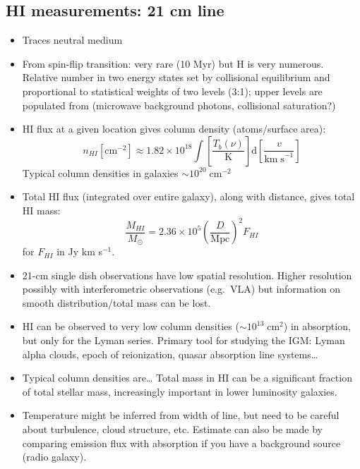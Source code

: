 \documentclass{article}
\begin{document}
\subsection{HI measurements: 21 cm line}
\begin{itemize}
    \item Traces neutral medium
    \item From spin-flip transition: very rare (10 Myr) but H is very
        numerous. Relative number in two energy states set by collisional
        equilibrium and proportional to statistical weights of two levels
        (3:1); upper levels are populated from (microwave background photons,
        collisional saturation?)
    \item HI flux at a given location gives column density (atoms/surface
        area):
        \[
        n_{HI} [\mathrm{cm}^{-2}] \approx 1.82\times10^{18}\int{
            \left[\frac{T_{b}(\nu)}{\mathrm{K}}\right]\mathrm{d}
            \left[\frac{v}{\mathrm{km\;s}^{-1}}\right]}
        \]
        Typical column densities in galaxies $\sim 10^{20}\;\mathrm{cm}^{-2}$
    \item Total HI flux (integrated over entire galaxy), along with distance,
        gives total HI mass:
        \[
            \frac{M_{HI}}{M_{\odot}} = 2.36\times10^{5}\left(
            \frac{D}{\mathrm{Mpc}}\right)^{2}F_{HI}
        \]
        for $F_{HI}$ in Jy km s$^{-1}$.
    \item 21-cm single dish observations have low spatial resolution.
        Higher resolution possibly with interferometric observations
        (e.g.\ VLA) but information on smooth distribution/total mass can
        be lost.
    \item HI can be observed to very low column densities
        ($\sim10^{13}\;\mathrm{cm}^{2}$) in absorption, but only for
        the Lyman series. Primary tool for studying the IGM:
        Lyman alpha clouds, epoch of reionization, quasar absorption
        line systems\ldots
    \item Typical column densities are\ldots
        Total mass in HI can be a significant fraction of total stellar
        mass, increasingly important in lower luminosity galaxies.
    \item Temperature might be inferred from width of line, but need to
        be careful about turbulence, cloud structure, etc. Estimate can
        also be made by comparing emission flux with absorption if you
        have a background source (radio galaxy).
\end{itemize}
\end{document}
